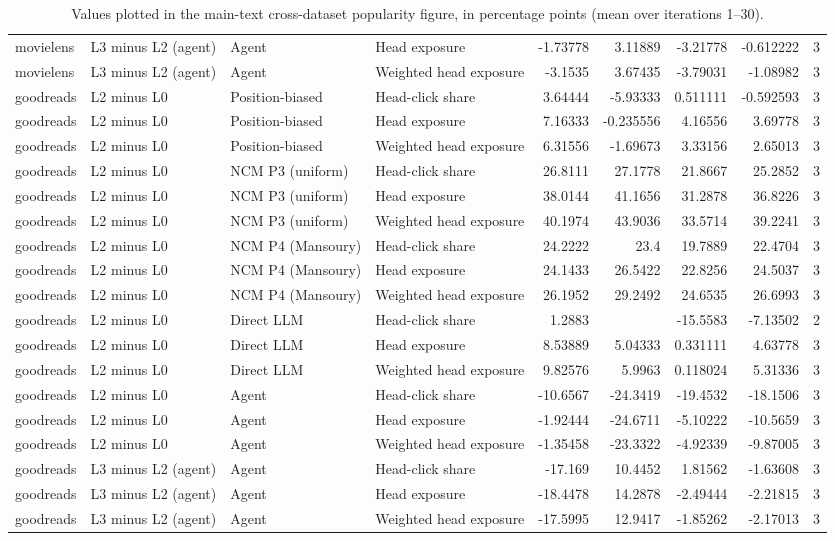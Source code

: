 \begin{table}[htbp!]
\begin{tabular}{llllrrrrr}
movielens & L3 minus L2 (agent) & Agent & Head exposure & -1.73778 & 3.11889 & -3.21778 & -0.612222 & 3 \\
movielens & L3 minus L2 (agent) & Agent & Weighted head exposure & -3.1535 & 3.67435 & -3.79031 & -1.08982 & 3 \\
goodreads & L2 minus L0 & Position-biased & Head-click share & 3.64444 & -5.93333 & 0.511111 & -0.592593 & 3 \\
goodreads & L2 minus L0 & Position-biased & Head exposure & 7.16333 & -0.235556 & 4.16556 & 3.69778 & 3 \\
goodreads & L2 minus L0 & Position-biased & Weighted head exposure & 6.31556 & -1.69673 & 3.33156 & 2.65013 & 3 \\
goodreads & L2 minus L0 & NCM P3 (uniform) & Head-click share & 26.8111 & 27.1778 & 21.8667 & 25.2852 & 3 \\
goodreads & L2 minus L0 & NCM P3 (uniform) & Head exposure & 38.0144 & 41.1656 & 31.2878 & 36.8226 & 3 \\
goodreads & L2 minus L0 & NCM P3 (uniform) & Weighted head exposure & 40.1974 & 43.9036 & 33.5714 & 39.2241 & 3 \\
goodreads & L2 minus L0 & NCM P4 (Mansoury) & Head-click share & 24.2222 & 23.4 & 19.7889 & 22.4704 & 3 \\
goodreads & L2 minus L0 & NCM P4 (Mansoury) & Head exposure & 24.1433 & 26.5422 & 22.8256 & 24.5037 & 3 \\
goodreads & L2 minus L0 & NCM P4 (Mansoury) & Weighted head exposure & 26.1952 & 29.2492 & 24.6535 & 26.6993 & 3 \\
goodreads & L2 minus L0 & Direct LLM & Head-click share & 1.2883 & \textemdash{} & -15.5583 & -7.13502 & 2 \\
goodreads & L2 minus L0 & Direct LLM & Head exposure & 8.53889 & 5.04333 & 0.331111 & 4.63778 & 3 \\
goodreads & L2 minus L0 & Direct LLM & Weighted head exposure & 9.82576 & 5.9963 & 0.118024 & 5.31336 & 3 \\
goodreads & L2 minus L0 & Agent & Head-click share & -10.6567 & -24.3419 & -19.4532 & -18.1506 & 3 \\
goodreads & L2 minus L0 & Agent & Head exposure & -1.92444 & -24.6711 & -5.10222 & -10.5659 & 3 \\
goodreads & L2 minus L0 & Agent & Weighted head exposure & -1.35458 & -23.3322 & -4.92339 & -9.87005 & 3 \\
goodreads & L3 minus L2 (agent) & Agent & Head-click share & -17.169 & 10.4452 & 1.81562 & -1.63608 & 3 \\
goodreads & L3 minus L2 (agent) & Agent & Head exposure & -18.4478 & 14.2878 & -2.49444 & -2.21815 & 3 \\
goodreads & L3 minus L2 (agent) & Agent & Weighted head exposure & -17.5995 & 12.9417 & -1.85262 & -2.17013 & 3 \\
\hline
\end{tabular}
\caption{Values plotted in the main-text cross-dataset popularity figure, in percentage points (mean over iterations 1--30).}
\label{chap:results:tab:main_rq6_cross_dataset_popularity_values}
\end{table}
